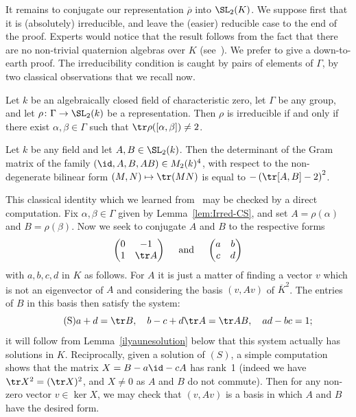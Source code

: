It remains to conjugate our representation $\overline{\rho}$ into $\SL_2(K)$.
We suppose first that it is (absolutely) irreducible, and leave the (easier)
reducible case to the end of the proof. Experts would notice that the result
follows from the fact that there are no non-trivial quaternion algebras over
$K$ (see~\cite{MaclachlanReid}). We prefer to give a down-to-earth proof.
The irreducibility condition is caught by pairs of elements of $\Gamma$, by
two classical observations that we recall now.
\begin{lemma}\label{lem:Irred-CS}
Let $k$ be an algebraically closed field of characteristic zero,
let $\Gamma$ be any group, and let $\rho\colon\Gamma\to\SL_2(k)$ be a
representation. Then $\rho$ is irreducible if and only if there exist
$\alpha,\beta\in\Gamma$ such that $\tr \rho([\alpha,\beta])\neq 2$.
\end{lemma}
\begin{lemma}\label{lem:gram}
Let $k$ be any field and let $A,B\in\SL_2(k)$. Then the determinant of the
Gram matrix of the family $(\id,A,B,AB)\in M_2(k)^4$, with respect to the
non-degenerate bilinear form $(M,N)\mapsto\tr(MN)$ is equal to
$- \left(\tr[A,B]-2\right)^2$.
\end{lemma}
This classical identity which we learned from~\cite{Saito} may be checked
by a direct computation. Fix $\alpha,\beta\in \Gamma$ given by
Lemma~\ref{lem:Irred-CS}, and set $A=\rho(\alpha)$ and $B=\rho(\beta)$.
Now we seek to conjugate $A$ and $B$ to the respective forms
\[ \begin{pmatrix} 0 & -1 \\ 1 & \tr A \end{pmatrix}\quad
\text{ and }\quad\begin{pmatrix} a & b \\ c & d\end{pmatrix} \]
with $a,b,c,d$ in $K$ as follows. For $A$ it is just a matter of finding a
vector $v$ which is not an eigenvector of $A$ and considering the basis
$(v,Av)$ of $\overline{K}^2$. The entries of $B$ in this basis then satisfy
the system:
\begin{equation}\tag{S}
a+d=\tr B,\quad b-c+d\tr A=\tr AB,\quad ad-bc=1;
\end{equation}
it will follow from Lemma~\ref{ilyaunesolution} below that this system
actually has solutions in $K$. Reciprocally, given a solution of $(S)$,
a simple computation shows that the matrix $X=B-a\id-c A$ has rank~1
(indeed we have $\tr X^2=(\tr X)^2$, and $X\ne 0$ as $A$ and $B$ do not
commute). Then for any non-zero vector $v\in \ker X$, we may check that
$(v,Av)$ is a basis in which $A$ and $B$ have the desired form.

